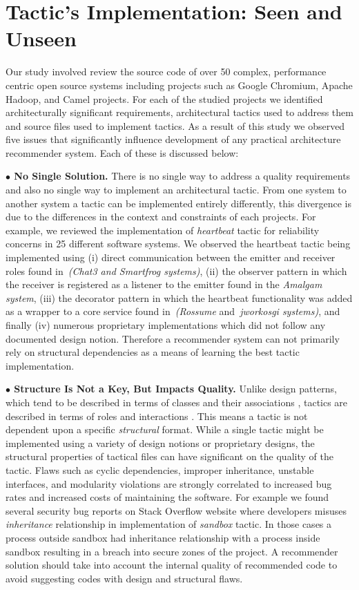 \section{Tactic's Implementation: Seen and Unseen}
Our study involved review the source code of over 50 complex, performance centric open source systems including projects such as Google Chromium, Apache Hadoop, and Camel projects. For each of the studied projects we identified architecturally significant requirements, architectural tactics used to address them and source files used to implement tactics.
As a result of this study we observed five issues that significantly influence development of any practical architecture recommender system. Each of these is discussed below:


\noindent \textbf{$\bullet$ No Single Solution.}
There is no single way to address a quality requirements and also no single way to implement an architectural tactic. From one system to another system a tactic can be implemented entirely differently, this divergence is due to the differences in the context and constraints of each projects.
For example, we reviewed the implementation of \emph{heartbeat} tactic for reliability concerns in 25 different software systems. We observed the heartbeat tactic being implemented using (i) direct communication between the emitter and receiver roles found in~\emph{(Chat3 and Smartfrog systems)}, (ii) the observer pattern in which the receiver is registered as a listener to the emitter found in the \emph{Amalgam system}, (iii) the decorator pattern in which the heartbeat functionality was added as a wrapper to a core service found in~\emph{(Rossume} and~\emph{jworkosgi systems)}, and finally (iv) numerous proprietary implementations which did not follow any documented design notion.
Therefore a recommender system can not primarily rely on structural dependencies as a means of learning the best tactic implementation.

\noindent \textbf{$\bullet$ Structure Is Not a Key, But Impacts Quality.}
Unlike design patterns, which tend to be described in terms of classes and their associations , tactics are described in terms of roles and interactions \cite{bass:arch12}.  This means a tactic is not dependent upon a specific {\em structural} format. While a single tactic might be implemented using a variety of design notions or proprietary designs, the structural properties of tactical files can have significant on the quality of the tactic. Flaws such as cyclic dependencies, improper inheritance, unstable interfaces, and modularity violations are strongly correlated to increased bug rates and increased costs of maintaining the software. For example we found several security bug reports on Stack Overflow website where developers misuses \emph{inheritance} relationship in implementation of \emph{sandbox} tactic. In those cases a process outside sandbox had inheritance relationship with a process inside sandbox resulting in a breach into secure zones of the project.
A recommender solution should take into account the internal quality of recommended code to avoid suggesting codes with design and structural flaws.


